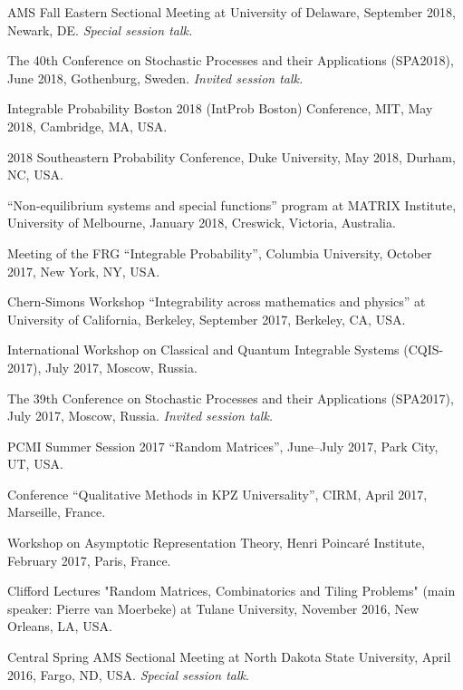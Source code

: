 \documentclass[letterpaper,11pt]{article}
\begin{document}
\begin{etaremune}
\item AMS Fall Eastern Sectional Meeting
	at University of Delaware,
	September 2018, Newark, DE.
		\emph{Special session talk.}
	\item
    The 40th Conference on Stochastic Processes and their
    Applications (SPA2018), June 2018, 
		Gothenburg, Sweden.
		\emph{Invited session talk.}
	\item
		Integrable Probability Boston 2018 (IntProb Boston)
		Conference, 
		MIT,
		May 2018, 
		Cambridge, MA, USA.
	\item
		2018 Southeastern Probability Conference,
		Duke University, 
		May 2018,
		Durham, NC, USA.
	\item 
		``Non-equilibrium systems and special functions'' program at MATRIX Institute,
		University of Melbourne, 
		January 2018, 
		Creswick, Victoria, Australia.
	\item 
		Meeting of the 
		FRG ``Integrable Probability'', Columbia University,
		October 2017, New York, NY, USA.

	\item Chern-Simons Workshop
		``Integrability across mathematics and physics'' 
		 at University of California, Berkeley,
			September 2017, Berkeley, CA, USA.
	\item
	      International Workshop on Classical and Quantum Integrable
	      Systems (CQIS-2017), July 2017, Moscow, Russia.
	\item
	      The 39th Conference on Stochastic Processes and their
	      Applications (SPA2017), July 2017, Moscow, Russia.
				\emph{Invited session talk.}

	\item
	      PCMI Summer Session 2017 ``Random Matrices'', June--July 2017,
	      Park City, UT, USA.

	\item
	      Conference ``Qualitative Methods in KPZ Universality'', CIRM,
	      April 2017, Marseille, France.

	\item
	      Workshop on Asymptotic Representation Theory, Henri Poincar\'e
	      Institute, February 2017, Paris, France.

	\item
	      Clifford Lectures "Random Matrices, Combinatorics and Tiling
	      Problems" (main speaker: Pierre van Moerbeke) at Tulane University, November
	      2016, New Orleans, LA, USA.

	\item
	      Central Spring AMS Sectional Meeting at North Dakota State
	      University, April 2016, Fargo, ND, USA. \emph{Special session talk}.


\end{etaremune}
\end{document}
